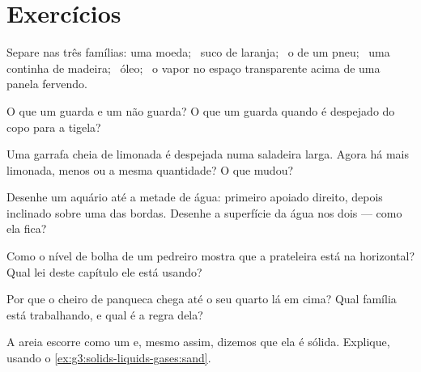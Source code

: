 \section{Exercícios}

\begin{exercise}[$\star$]\label{exo:g3:solids-liquids-gases:1}
Separe nas três famílias: uma moeda; \ suco de laranja; \ o  de um
pneu; \ uma continha de madeira; \ óleo; \ o vapor no espaço
transparente acima de uma panela fervendo.
\end{exercise}

\begin{exercise}[$\star$]\label{exo:g3:solids-liquids-gases:2}
O que um  guarda e um  não guarda? O que um 
guarda quando é despejado do copo para a tigela?
\end{exercise}

\begin{exercise}[$\star$]\label{exo:g3:solids-liquids-gases:3}
Uma garrafa cheia de limonada é despejada numa saladeira larga. Agora
há mais limonada, menos ou a mesma quantidade? O que mudou?
\end{exercise}

\begin{exercise}[$\star$]\label{exo:g3:solids-liquids-gases:4}
Desenhe um aquário até a metade de água: primeiro apoiado direito,
depois inclinado sobre uma das bordas. Desenhe a superfície da água
nos dois --- como ela fica?
\end{exercise}

\begin{exercise}[$\star$]\label{exo:g3:solids-liquids-gases:5}
Como o nível de bolha de um pedreiro mostra que a prateleira está na
horizontal? Qual lei deste capítulo ele está usando?
\end{exercise}

\begin{exercise}[$\star$]\label{exo:g3:solids-liquids-gases:6}
Por que o cheiro de panqueca chega até o seu quarto lá em cima? Qual
família está trabalhando, e qual é a regra dela?
\end{exercise}

\begin{exercise}[$\star$]\label{exo:g3:solids-liquids-gases:7}
A areia escorre como um  e, mesmo assim, dizemos que ela é
sólida. Explique, usando o \cref{ex:g3:solids-liquids-gases:sand}.
\end{exercise}

